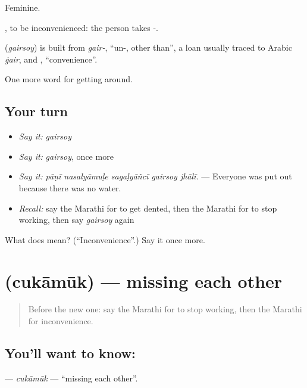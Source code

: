 Feminine.

 , to be inconvenienced: the person takes -.

\begin{cousinweb}
\textbf{} (\emph{gairsoy}) is built from \emph{gair-}, \textquotedblleft{}un-, other than\textquotedblright{}, a loan usually traced to Arabic \emph{ġair}, and \textbf{}, \textquotedblleft{}convenience\textquotedblright{}.
\end{cousinweb}

\begin{grammarlens}[title={What you've built}]
One more word for getting around.
\end{grammarlens}

\subsection*{Your turn}
\begin{itemize}
\raggedright
  \item \emph{Say it:} \emph{gairsoy}
  \item \emph{Say it:} \emph{gairsoy}, once more
  \item \emph{Say it:} \emph{pāṇī nasalyāmuḷe sagaḷyāñcī gairsoy jhālī.} — Everyone was put out because there was no water.
  \item \emph{Recall:} say the Marathi for to get dented, then the Marathi for to stop working, then say \emph{gairsoy} again
\end{itemize}

\begin{tcolorbox}[breakable,colback=teal!4,colframe=teal!35!black,title={Before you move on}]
What does  mean? (\textquotedblleft{}Inconvenience\textquotedblright{}.) Say it once more.
\end{tcolorbox}
\section[\texorpdfstring{\mr{चुकामूक} (cukāmūk)}{चुकामूक (cukāmūk)}]{ (cukāmūk) — missing each other}

\label{lesson:MR-C434-cukamuk}



\begin{quote}
Before the new one: say the Marathi for to stop working, then the Marathi for inconvenience.
\end{quote}

\subsection*{You'll want to know: }
\textbf{} — \emph{cukāmūk} — \textquotedblleft{}missing each other\textquotedblright{}.


